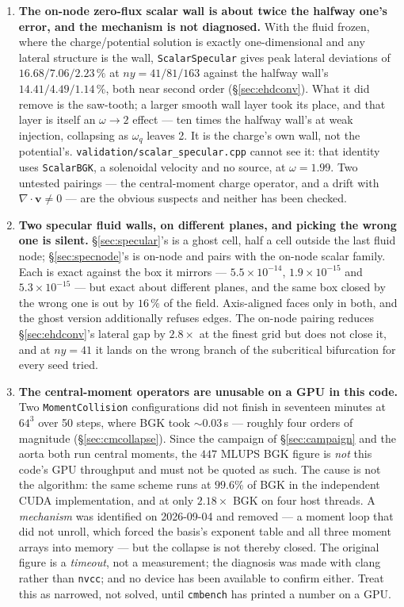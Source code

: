\documentclass[11pt,a4paper]{article}
\newcommand{\code}[1]{\texttt{\small #1}}
\begin{document}
\begin{enumerate}[leftmargin=1.4em,itemsep=4pt]
\item \textbf{The on-node zero-flux scalar wall is about twice the halfway
  one's error, and the mechanism is not diagnosed.} With the fluid frozen, where
  the charge/potential solution is exactly one-dimensional and any lateral
  structure is the wall, \code{ScalarSpecular} gives peak lateral deviations of
  $16.68/7.06/2.23\,\%$ at $ny=41/81/163$ against the halfway wall's
  $14.41/4.49/1.14\,\%$, both near second order (\S\ref{sec:ehdconv}). What it
  did remove is the saw-tooth; a larger smooth wall layer took its place, and
  that layer is itself an $\omega\to2$ effect --- ten times the halfway wall's
  at weak injection, collapsing as $\omega_q$ leaves 2. It is the charge's own
  wall, not the potential's. \code{validation/scalar\_specular.cpp} cannot see
  it: that identity uses \code{ScalarBGK}, a solenoidal velocity and no source,
  at $\omega=1.99$. Two untested pairings --- the central-moment charge
  operator, and a drift with $\nabla\!\cdot\!\bm{v}\neq0$ --- are the obvious
  suspects and neither has been checked.

\item \textbf{Two specular fluid walls, on different planes, and picking the
  wrong one is silent.} \S\ref{sec:specular}'s is a ghost cell, half a cell
  outside the last fluid node; \S\ref{sec:specnode}'s is on-node and pairs with
  the on-node scalar family. Each is exact against the box it mirrors ---
  $5.5\times10^{-14}$, $1.9\times10^{-15}$ and $5.3\times10^{-15}$ --- but exact
  about different planes, and the same box closed by the wrong one is out by
  $16\,\%$ of the field. Axis-aligned faces only in both, and the ghost version
  additionally refuses edges. The on-node pairing reduces
  \S\ref{sec:ehdconv}'s lateral gap by $2.8\times$ at the finest grid but does
  not close it, and at $ny=41$ it lands on the wrong branch of the subcritical
  bifurcation for every seed tried.

\item \textbf{The central-moment operators are unusable on a GPU in this code.}
  Two \code{MomentCollision} configurations did not finish in seventeen minutes at
  $64^3$ over 50 steps, where BGK took $\sim0.03$\,s --- roughly four orders of
  magnitude (\S\ref{sec:cmcollapse}). Since the campaign of \S\ref{sec:campaign}
  and the aorta both run central moments, the $447$ MLUPS BGK figure is
  \emph{not} this code's GPU throughput and must not be quoted as such. The
  cause is not the algorithm: the same scheme runs at $99.6\%$ of BGK in the
  independent CUDA implementation, and at only $2.18\times$ BGK on four host
  threads. A \emph{mechanism} was identified on 2026-09-04 and removed --- a
  moment loop that did not unroll, which forced the basis's exponent table and
  all three moment arrays into memory --- but the collapse is not thereby
  closed. The original figure is a \emph{timeout}, not a measurement; the
  diagnosis was made with clang rather than \code{nvcc}; and no device has been
  available to confirm either. Treat this as narrowed, not solved, until
  \code{cmbench} has printed a number on a GPU.


\end{enumerate}
\end{document}
